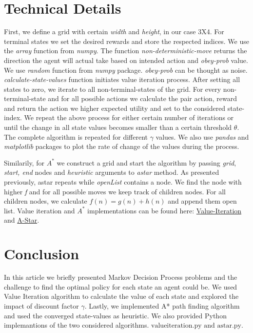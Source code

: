 \documentclass[10pt,a4paper,twocolumn]{article}
\begin{document}
		
	\section{Technical Details}	
	First, we define a grid with certain \textit{width} and \textit{height}, in our case 3X4. For terminal states we set the desired rewards and store the respected indices. We use the \textit{array} function from \textit{numpy}.  The function \textit{non-deterministic-move} returns the direction the agent will actual take based on intended action and \textit{obey-prob} value. We use \textit{random} function from \textit{numpy} package. \textit{obey-prob} can be thought as noise. \textit{calculate-state-values} function initiates value iteration process. After setting all states to zero, we iterate to all non-terminal-states of the grid. For every non-terminal-state and for all possible actions we calculate the pair {action, reward}  and return the action we higher expected utility and set to the considered state-index. We repeat the above process for either certain number of iterations or until the change in all state values becomes smaller than a certain threshold $\theta$. The complete algorithm is repeated for different $\gamma$ values. We also use \textit{pandas} and \textit{matplotlib} packages to plot the rate of change of the values during the process.

	Similarily, for ${A^*}$ we construct a grid and start the algorithm by passing \textit{grid}, \textit{start, end} nodes and \textit{heuristic} arguments to \textit{astar} method. As presented previously, astar repeats while \textit{openList} contains a node. We find the node with higher \textit{f} and for all possible moves we keep track of children nodes. For all children nodes, we calculate $f(n) = g(n) + h(n)$ and append them open list. Value iteration and  $A^{*}$ implementations can be found here:
	\href{https://github.com/vassilispapadop/reinforcement-learning/blob/master/src/value_iteration.py}{Value-Iteration}
	and \href{https://github.com/vassilispapadop/reinforcement-learning/blob/master/src/a_star.py}{A-Star}.
	
	\section{Conclusion}
	In this article we briefly presented Markov Decision Process problems and the challenge to find the optimal policy for each state an agent could be. We used Value Iteration algorithm to calculate the value of each state and explored the impact of discount factor $\gamma$. Lastly, we implemented A* path finding algorithm and used the converged state-values as heuristic.
	We also provided Python implemantions of the two considered algorithms. $\text{valueiteration.py and astar.py}$.
		
\end{document}
